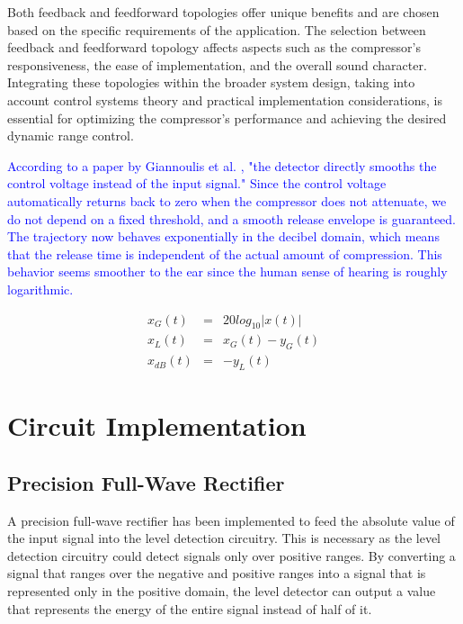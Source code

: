 \documentclass[10pt]{article}
\begin{document}
\begin{multicols*}{2}
                Both feedback and feedforward topologies offer unique benefits and are chosen based on the specific requirements of the application. The selection between feedback and feedforward topology affects aspects such as the compressor's responsiveness, the ease of implementation, and the overall sound character. Integrating these topologies within the broader system design, taking into account control systems theory and practical implementation considerations, is essential for optimizing the compressor's performance and achieving the desired dynamic range control.\par
                \textcolor{blue}{According to a paper by Giannoulis et al. \cite{drc-tutorial}, "the detector directly smooths the control voltage instead of the input signal." Since the control voltage automatically returns back to zero when the compressor does not attenuate, we do not depend on a fixed threshold, and a smooth release envelope is guaranteed. The trajectory now behaves exponentially in the decibel domain, which means that the release time is independent of the actual amount of compression. This behavior seems smoother to the ear since the human sense of hearing is roughly logarithmic.} 

                \begin{eqnarray}
                    x_G(t)&=&20log_{10}|x(t)|\\
                    x_L(t)&=&x_G(t)-y_G(t)\\
                    x_{dB}(t)&=&-y_L(t)
                \end{eqnarray}
                        
        \section{Circuit Implementation}

            \subsection{Precision Full-Wave Rectifier}
                A precision full-wave rectifier has been implemented to feed the absolute value of the input signal into the level detection circuitry. This is necessary as the level detection circuitry could detect signals only over positive ranges. By converting a signal that ranges over the negative and positive ranges into a signal that is represented only in the positive domain, the level detector can output a value that represents the energy of the entire signal instead of half of it.
                

\end{multicols*}
\end{document}
